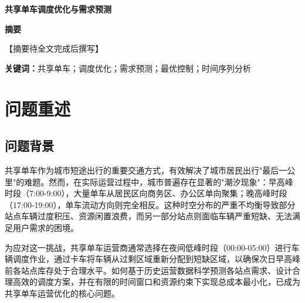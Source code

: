 \documentclass[12pt,a4paper]{ctexart}
\begin{document}

\thispagestyle{empty}
\begin{center}
    \vspace*{2cm}
    {\Huge\bfseries 共享单车调度优化与需求预测}

    \vspace{1cm}

\end{center}

\vspace{2cm}

\begin{center}
    {\LARGE\bfseries 摘\quad 要}
\end{center}

\vspace{0.5cm}

【摘要待全文完成后撰写】

\vspace{0.5cm}

\noindent\textbf{关键词：}共享单车；调度优化；需求预测；最优控制；时间序列分析

\newpage

\setcounter{page}{1}

\tableofcontents
\newpage


\section{问题重述}

\subsection{问题背景}

共享单车作为城市短途出行的重要交通方式，有效解决了城市居民出行"最后一公里"的难题。然而，在实际运营过程中，城市普遍存在显著的"潮汐现象"：早高峰时段（7:00-9:00），大量单车从居民区向商务区、办公区单向聚集；晚高峰时段（17:00-19:00），单车流动方向则完全相反。这种时空分布的严重不均衡导致部分站点车辆过度积压、资源闲置浪费，而另一部分站点则面临车辆严重短缺、无法满足用户需求的困境。

为应对这一挑战，共享单车运营商通常选择在夜间低峰时段（00:00-05:00）进行车辆调度作业，通过卡车将车辆从过剩区域重新分配到短缺区域，以确保次日早高峰前各站点库存处于合理水平。如何基于历史运营数据科学预测各站点需求、设计合理高效的调度方案，并在有限的时间窗口和资源约束下实现总成本最小化，已成为共享单车运营优化的核心问题。
\end{document}
